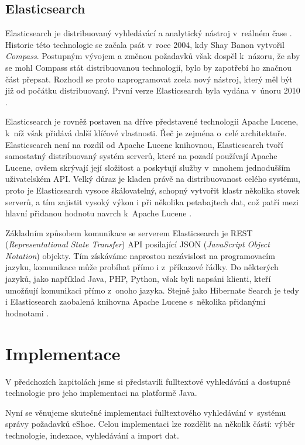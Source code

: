 \documentclass[11pt,oneside]{fithesis2}
\begin{document}
\section{Elasticsearch}
Elasticsearch je distribuovaný vyhledávácí a analytický nástroj v~reálném čase  \cite{ElasticsearchDefinitiveGuide}. Historie této technologie se začala psát v~roce 2004, kdy Shay Banon vytvořil \emph{Compass}. Postupným vývojem a změnou požadavků však dospěl k~názoru, že aby se mohl Compass stát distribuovanou technologií, bylo by zapotřebí ho značnou část přepsat. Rozhodl se proto naprogramovat zcela nový nástroj, který měl být již od počátku distribuovaný. První verze Elasticsearch byla vydána v~únoru 2010 \cite{ElasticsearchWiki}.

Elasticsearch je rovněž postaven na dříve představené technologii Apache Lucene, k~níž však přidává další klíčové vlastnosti. Řeč je zejména o~celé architektuře. Elasticsearch není na rozdíl od Apache Lucene knihovnou, Elasticsearch tvoří samostatný distribuovaný systém serverů, které na pozadí používají Apache Lucene, ovšem skrývají její složitost a poskytují služby v~mnohem jednodušším uživatelském API. Velký důraz je kladen právě na distribuovanost celého systému, proto je Elasticsearch vysoce škálovatelný, schopný vytvořit klastr několika stovek serverů, a tím zajistit vysoký výkon i při několika petabajtech dat, což patří mezi hlavní přidanou hodnotu navrch k~Apache Lucene \cite{ElasticsearchDefinitiveGuide}.

Základním způsobem komunikace se serverem Elasticsearch je REST (\emph{Representational State Transfer}) API posílající JSON (\emph{JavaScript Object Notation}) objekty. Tím získáváme naprostou nezávislost na programovacím jazyku, komunikace může probíhat přímo i z~příkazové řádky. Do některých jazyků, jako například Java, PHP, Python, však byli napsáni klienti, kteří umožňují komunikaci přímo z~onoho jazyka. Stejně jako Hibernate Search je tedy i Elasticsearch zaobalená knihovna Apache Lucene s~několika přidanými hodnotami \cite{ElasticsearchDefinitiveGuide}. 

\chapter{Implementace}
V předchozích kapitolách jsme si představili fulltextové vyhledávání a dostupné technologie pro jeho implementaci na platformě Java. 

Nyní se věnujeme skutečné implementaci fulltextového vyhledávání v~systému správy požadavků eShoe. Celou implementaci lze rozdělit na několik částí: výběr technologie, indexace, vyhledávání a import dat.
\end{document}

